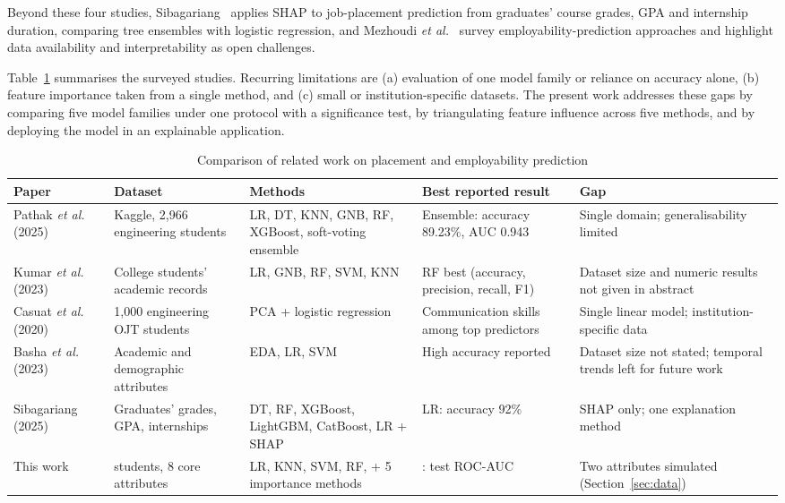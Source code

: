 \documentclass[conference]{IEEEtran}
\begin{document}
Beyond these four studies, Sibagariang~\cite{sibagariang2025interpretable} applies SHAP to job-placement
prediction from graduates' course grades, GPA and internship duration, comparing tree ensembles with logistic
regression, and Mezhoudi \emph{et al.}~\cite{mezhoudi2023employability} survey employability-prediction
approaches and highlight data availability and interpretability as open challenges.

Table~\ref{tab:lit} summarises the surveyed studies. Recurring limitations are (a) evaluation of one model family or reliance on accuracy alone, (b) feature
importance taken from a single method, and (c) small or institution-specific datasets. The present work addresses these gaps by comparing five model families under one
protocol with a significance test, by triangulating feature influence across five methods, and by deploying the
model in an explainable application.

\begin{table}[t]
\centering
\caption{Comparison of related work on placement and employability prediction}
\label{tab:lit}
\footnotesize
\begin{tabular}{p{2.3cm}p{3.6cm}p{3.6cm}p{2.9cm}p{3.6cm}}
\toprule
Paper & Dataset & Methods & Best reported result & Gap \\
\midrule
Pathak \emph{et al.}~\cite{pathak2025framework} (2025) & Kaggle, 2{,}966 engineering students & LR, DT, KNN, GNB, RF, XGBoost, soft-voting ensemble & Ensemble: accuracy 89.23\%, AUC 0.943 & Single domain; generalisability limited \\
Kumar \emph{et al.}~\cite{kumar2023predicting} (2023) & College students' academic records & LR, GNB, RF, SVM, KNN & RF best (accuracy, precision, recall, F1) & Dataset size and numeric results not given in abstract \\
Casuat \emph{et al.}~\cite{casuat2020steps} (2020) & 1{,}000 engineering OJT students & PCA + logistic regression & Communication skills among top predictors & Single linear model; institution-specific data \\
Basha \emph{et al.}~\cite{basha2023unraveling} (2023) & Academic and demographic attributes & EDA, LR, SVM & High accuracy reported & Dataset size not stated; temporal trends left for future work \\
Sibagariang~\cite{sibagariang2025interpretable} (2025) & Graduates' grades, GPA, internships & DT, RF, XGBoost, LightGBM, CatBoost, LR + SHAP & LR: accuracy 92\% & SHAP only; one explanation method \\
\midrule
This work & \RawRows{} students, 8 core attributes & LR, KNN, SVM, RF, \XGBName{} + 5 importance methods & \BestModel{}: test ROC-AUC \BestTestAUC{} & Two attributes simulated (Section~\ref{sec:data}) \\
\bottomrule
\end{tabular}
\end{table}
\end{document}
